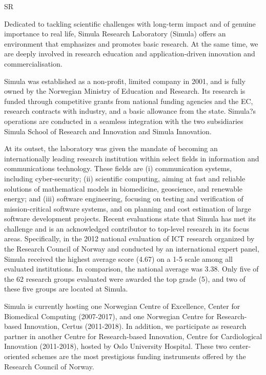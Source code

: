 \begin{sitedescription}{SR}

Dedicated to tackling scientific challenges with long-term impact and of genuine importance to real life, Simula Research Laboratory (Simula) offers an environment that emphasizes and promotes basic research. At the same time, we are deeply involved in research education and application-driven innovation and commercialisation. 

Simula was established as a non-profit, limited company in 2001, and is fully owned by the Norwegian Ministry of Education and Research. Its research is funded through competitive grants from national funding agencies and the EC, research contracts with industry, and a basic allowance from the state.  Simula?s operations are conducted in a seamless integration with the two subsidiaries Simula School of Research and Innovation and Simula Innovation.

At its outset, the laboratory was given the mandate of becoming an internationally leading research institution within select fields in information and communications technology. These fields are (i) communication systems, including cyber-security; (ii) scientific computing, aiming at fast and reliable solutions of mathematical models in biomedicine, geoscience, and renewable energy; and (iii) software engineering, focusing on testing and verification of mission-critical software systems, and on planning and cost estimation of large software development projects. Recent evaluations state that Simula has met its challenge and is an acknowledged contributor to top-level research in its focus areas. Specifically, in the 2012 national evaluation of ICT research organized by the Research Council of Norway and conducted by an international expert panel, Simula received the highest average score (4.67) on a 1-5 scale among all evaluated institutions.  In comparison, the national average was 3.38. Only five of the 62 research groups evaluated were awarded the top grade (5), and two of these five groups are located at Simula.

Simula is currently hosting one Norwegian Centre of Excellence, Center for Biomedical Computing (2007-2017), and one Norwegian Centre for Research-based Innovation, Certus (2011-2018). In addition, we participate as research partner in another Centre for Research-based Innovation, Centre for Cardiological Innovation (2011-2018), hosted by Oslo University Hospital. These two center-oriented schemes are the most prestigious funding instruments offered by the Research Council of Norway. 


\end{sitedescription}
